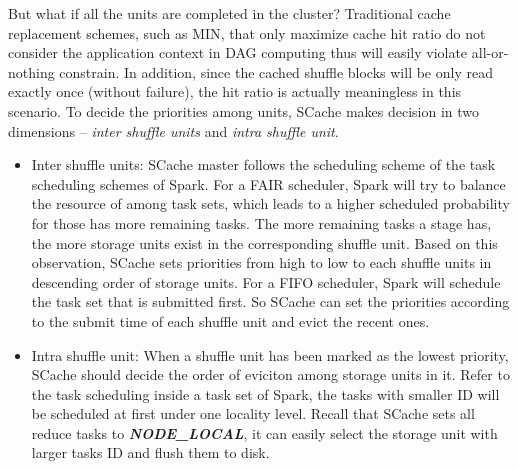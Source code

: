 But what if all the units are completed in the cluster? Traditional cache replacement schemes, such as MIN\cite{min}, that only maximize cache hit ratio do not consider the application context in DAG computing thus will easily violate all-or-nothing constrain. In addition, since the cached shuffle blocks will be only read exactly once (without failure), the hit ratio is actually meaningless in this scenario. To decide the priorities among units, SCache makes decision in two dimensions -- \textit{inter shuffle units} and \textit{intra shuffle unit}. 
\begin{itemize}[noitemsep]
	\item Inter shuffle units: SCache master follows the scheduling scheme of the task scheduling schemes of Spark. For a FAIR scheduler, Spark will try to balance the resource of among task sets, which leads to a higher scheduled probability for those has more remaining tasks.  The more remaining tasks a stage has, the more storage units exist in the corresponding shuffle unit. Based on this observation, SCache sets priorities from high to low to each shuffle units in descending order of storage units. For a FIFO scheduler, Spark will schedule the task set that is submitted first. So SCache can set the priorities according to the submit time of each shuffle unit and evict the recent ones.
	\item Intra shuffle unit: When a shuffle unit has been marked as the lowest priority, SCache should decide the order of eviciton among storage units in it. Refer to the task scheduling inside a task set of Spark, the tasks with smaller ID will be scheduled at first under one locality level. Recall that SCache sets all reduce tasks to \textbf{\textit{NODE\_LOCAL}}, it can easily select the storage unit with larger tasks ID and flush them to disk.
\end{itemize}

